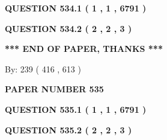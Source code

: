 \documentclass[12pt]{article}
\begin{document}
 
 
 
   
   
  
\vspace{0.2in}
  
{\textbf{\Large{QUESTION
534.1 
 ( 1 , 1 , 6791 )
}}}
  
  
  
\vspace{0.2in}
  
{\textbf{\Large{QUESTION
534.2 
 ( 2 , 2 , 3 )
}}}
  
  
   
   
 \vspace{0.2in}
 
   
   
   
   
\vspace{1.0in} 
{\textbf{\large{ *** END OF PAPER, THANKS *** }}} 
   
   
\hspace{1.0in} By: 
 239 ( 416 ,  613 )
   
   
   
   
\newpage 
\setcounter{page}{ 
   535001 } 
   
   
   
   
 {\textbf{ \Large{ PAPER NUMBER  535  }}}
   
   
\vspace{0.2in}
   
   
   
   
   
   
 \vspace{0.2in}
 
 
 
 
   
   
  
\vspace{0.2in}
  
{\textbf{\Large{QUESTION
535.1 
 ( 1 , 1 , 6791 )
}}}
  
  
  
\vspace{0.2in}
  
{\textbf{\Large{QUESTION
535.2 
 ( 2 , 2 , 3 )
}}}
  
  
   
   
 \vspace{0.2in}
 
   
   
   
   
\end{document}
